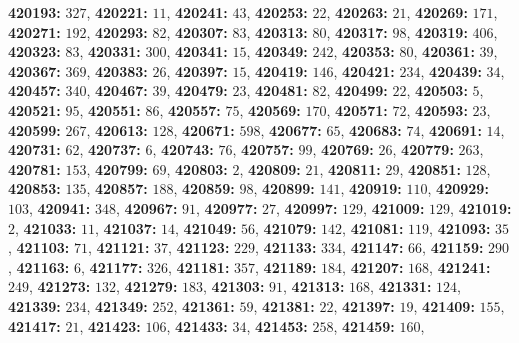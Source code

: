 \textsf{\bfseries 420193:} $327$, \textsf{\bfseries 420221:} $11$, \textsf{\bfseries 420241:} $43$, \textsf{\bfseries 420253:} $22$, \textsf{\bfseries 420263:} $21$, \textsf{\bfseries 420269:} $171$, \textsf{\bfseries 420271:} $192$, \textsf{\bfseries 420293:} $82$, \textsf{\bfseries 420307:} $83$, \textsf{\bfseries 420313:} $80$, \textsf{\bfseries 420317:} $98$, \textsf{\bfseries 420319:} $406$, \textsf{\bfseries 420323:} $83$, \textsf{\bfseries 420331:} $300$, \textsf{\bfseries 420341:} $15$, \textsf{\bfseries 420349:} $242$, \textsf{\bfseries 420353:} $80$, \textsf{\bfseries 420361:} $39$, \textsf{\bfseries 420367:} $369$, \textsf{\bfseries 420383:} $26$, \textsf{\bfseries 420397:} $15$, \textsf{\bfseries 420419:} $146$, \textsf{\bfseries 420421:} $234$, \textsf{\bfseries 420439:} $34$, \textsf{\bfseries 420457:} $340$, \textsf{\bfseries 420467:} $39$, \textsf{\bfseries 420479:} $23$, \textsf{\bfseries 420481:} $82$, \textsf{\bfseries 420499:} $22$, \textsf{\bfseries 420503:} $5$, \textsf{\bfseries 420521:} $95$, \textsf{\bfseries 420551:} $86$, \textsf{\bfseries 420557:} $75$, \textsf{\bfseries 420569:} $170$, \textsf{\bfseries 420571:} $72$, \textsf{\bfseries 420593:} $23$, \textsf{\bfseries 420599:} $267$, \textsf{\bfseries 420613:} $128$, \textsf{\bfseries 420671:} $598$, \textsf{\bfseries 420677:} $65$, \textsf{\bfseries 420683:} $74$, \textsf{\bfseries 420691:} $14$, \textsf{\bfseries 420731:} $62$, \textsf{\bfseries 420737:} $6$, \textsf{\bfseries 420743:} $76$, \textsf{\bfseries 420757:} $99$, \textsf{\bfseries 420769:} $26$, \textsf{\bfseries 420779:} $263$, \textsf{\bfseries 420781:} $153$, \textsf{\bfseries 420799:} $69$, \textsf{\bfseries 420803:} $2$, \textsf{\bfseries 420809:} $21$, \textsf{\bfseries 420811:} $29$, \textsf{\bfseries 420851:} $128$, \textsf{\bfseries 420853:} $135$, \textsf{\bfseries 420857:} $188$, \textsf{\bfseries 420859:} $98$, \textsf{\bfseries 420899:} $141$, \textsf{\bfseries 420919:} $110$, \textsf{\bfseries 420929:} $103$, \textsf{\bfseries 420941:} $348$, \textsf{\bfseries 420967:} $91$, \textsf{\bfseries 420977:} $27$, \textsf{\bfseries 420997:} $129$, \textsf{\bfseries 421009:} $129$, \textsf{\bfseries 421019:} $2$, \textsf{\bfseries 421033:} $11$, \textsf{\bfseries 421037:} $14$, \textsf{\bfseries 421049:} $56$, \textsf{\bfseries 421079:} $142$, \textsf{\bfseries 421081:} $119$, \textsf{\bfseries 421093:} $35$, \textsf{\bfseries 421103:} $71$, \textsf{\bfseries 421121:} $37$, \textsf{\bfseries 421123:} $229$, \textsf{\bfseries 421133:} $334$, \textsf{\bfseries 421147:} $66$, \textsf{\bfseries 421159:} $290$, \textsf{\bfseries 421163:} $6$, \textsf{\bfseries 421177:} $326$, \textsf{\bfseries 421181:} $357$, \textsf{\bfseries 421189:} $184$, \textsf{\bfseries 421207:} $168$, \textsf{\bfseries 421241:} $249$, \textsf{\bfseries 421273:} $132$, \textsf{\bfseries 421279:} $183$, \textsf{\bfseries 421303:} $91$, \textsf{\bfseries 421313:} $168$, \textsf{\bfseries 421331:} $124$, \textsf{\bfseries 421339:} $234$, \textsf{\bfseries 421349:} $252$, \textsf{\bfseries 421361:} $59$, \textsf{\bfseries 421381:} $22$, \textsf{\bfseries 421397:} $19$, \textsf{\bfseries 421409:} $155$, \textsf{\bfseries 421417:} $21$, \textsf{\bfseries 421423:} $106$, \textsf{\bfseries 421433:} $34$, \textsf{\bfseries 421453:} $258$, \textsf{\bfseries 421459:} $160$, 
